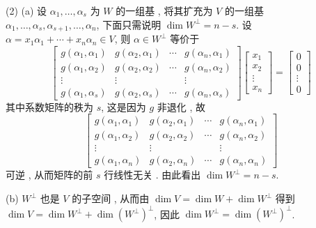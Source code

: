 \documentclass[10pt]{article}
\begin{document}
(2) (a)  设  $\alpha_{1}, \ldots, \alpha_{s}$  为  $W$  的一组基 ,  将其扩充为  $V$  的一组基  $\alpha_{1}, \ldots, \alpha_{s}, \alpha_{s+1}, \ldots, \alpha_{n}$,  下面只需说明  $\operatorname{dim} W^{\perp}=n-s$.  设  $\alpha=x_{1} \alpha_{1}+\cdots+x_{n} \alpha_{n} \in V$,  则  $\alpha \in W^{\perp}$  等价于 
$$
\left[\begin{array}{cccc}
g\left(\alpha_{1}, \alpha_{1}\right) & g\left(\alpha_{2}, \alpha_{1}\right) & \cdots & g\left(\alpha_{n}, \alpha_{1}\right) \\
g\left(\alpha_{1}, \alpha_{2}\right) & g\left(\alpha_{2}, \alpha_{2}\right) & \cdots & g\left(\alpha_{n}, \alpha_{2}\right) \\
\vdots & \vdots & & \vdots \\
g\left(\alpha_{1}, \alpha_{s}\right) & g\left(\alpha_{2}, \alpha_{s}\right) & \cdots & g\left(\alpha_{n}, \alpha_{s}\right)
\end{array}\right]\left[\begin{array}{c}
x_{1} \\
x_{2} \\
\vdots \\
x_{n}
\end{array}\right]=\left[\begin{array}{c}
0 \\
0 \\
\vdots \\
0
\end{array}\right]
$$
 其中系数矩阵的秩为  $s$,  这是因为  $g$  非退化 ,  故 
$$
\left[\begin{array}{cccc}
g\left(\alpha_{1}, \alpha_{1}\right) & g\left(\alpha_{2}, \alpha_{1}\right) & \cdots & g\left(\alpha_{n}, \alpha_{1}\right) \\
g\left(\alpha_{1}, \alpha_{2}\right) & g\left(\alpha_{2}, \alpha_{2}\right) & \cdots & g\left(\alpha_{n}, \alpha_{2}\right) \\
\vdots & \vdots & & \vdots \\
g\left(\alpha_{1}, \alpha_{n}\right) & g\left(\alpha_{2}, \alpha_{n}\right) & \cdots & g\left(\alpha_{n}, \alpha_{n}\right)
\end{array}\right]
$$
 可逆 ,  从而矩阵的前  $s$  行线性无关 .  由此看出  $\operatorname{dim} W^{\perp}=n-s$.

(b) $W^{\perp}$  也是  $V$  的子空间 ,  从而由  $\operatorname{dim} V=\operatorname{dim} W+\operatorname{dim} W^{\perp}$  得到  $\operatorname{dim} V=\operatorname{dim} W^{\perp}+\operatorname{dim}\left(W^{\perp}\right)^{\perp}$,  因此  $\operatorname{dim} W^{\perp}=\operatorname{dim}\left(W^{\perp}\right)^{\perp}$.
\end{document}
